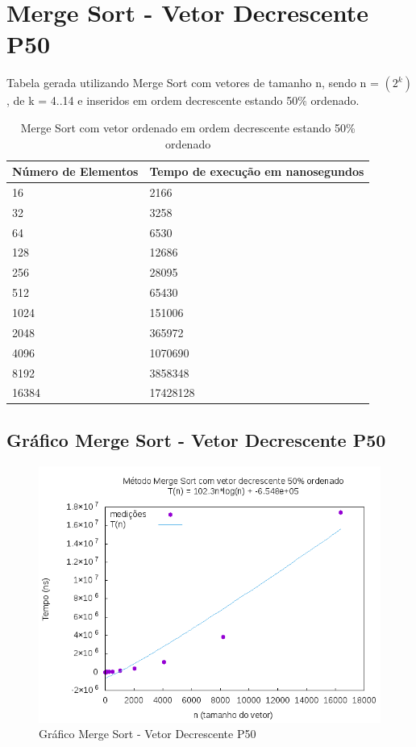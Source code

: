 \documentclass[12pt,a4paper,twoside]{report}
\begin{document}
\section{Merge Sort - Vetor Decrescente P50}
Tabela gerada utilizando Merge Sort com vetores de tamanho n, sendo n = $(2^k)$, de k = 4..14 e inseridos em ordem decrescente estando 50\% ordenado.
\begin{table}[H]
\centering
\caption{Merge Sort com vetor ordenado em ordem decrescente estando 50\% ordenado}
\label{my-label}
\begin{tabular}{|l|l|}
\hline
\multicolumn{1}{|c|}{\textbf{Número de Elementos}} & \multicolumn{1}{c|}{\textbf{Tempo de execução em nanosegundos}} \\ \hline
16 & 2166 \\ \hline
32 & 3258 \\ \hline
64 & 6530 \\ \hline
128 & 12686 \\ \hline
256 & 28095 \\ \hline
512 & 65430 \\ \hline
1024 & 151006 \\ \hline
2048 & 365972 \\ \hline
4096 & 1070690 \\ \hline
8192 & 3858348 \\ \hline
16384 & 17428128 \\ \hline
\end{tabular}
\end{table}

\subsection{Gráfico Merge Sort - Vetor Decrescente P50}
\begin{figure}[H]
    \centering
    \includegraphics[width=0.7\linewidth]{graficos/MergeSort/vIntDecrescenteP50/vIntDecrescenteP50.png}
  \caption{Gráfico Merge Sort - Vetor Decrescente P50}
\end{figure}
\end{document}
